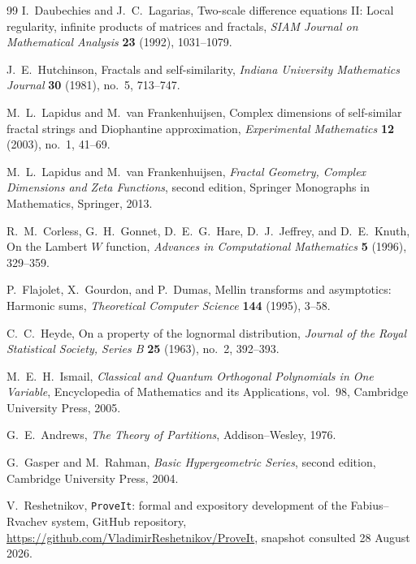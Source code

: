 \documentclass[11pt,oneside]{article}
\theoremstyle{definition}
\theoremstyle{remark}
\begin{document}
\begin{thebibliography}{99}
I.~Daubechies and J.~C.~Lagarias,
\newblock Two-scale difference equations II: Local regularity, infinite products of matrices and fractals,
\newblock \emph{SIAM Journal on Mathematical Analysis} \textbf{23} (1992), 1031--1079.

J.~E.~Hutchinson,
\newblock Fractals and self-similarity,
\newblock \emph{Indiana University Mathematics Journal} \textbf{30} (1981), no.~5, 713--747.

M.~L.~Lapidus and M.~van Frankenhuijsen,
\newblock Complex dimensions of self-similar fractal strings and Diophantine approximation,
\newblock \emph{Experimental Mathematics} \textbf{12} (2003), no.~1, 41--69.

M.~L.~Lapidus and M.~van Frankenhuijsen,
\newblock \emph{Fractal Geometry, Complex Dimensions and Zeta Functions}, second edition,
\newblock Springer Monographs in Mathematics, Springer, 2013.

R.~M.~Corless, G.~H.~Gonnet, D.~E.~G.~Hare, D.~J.~Jeffrey, and D.~E.~Knuth,
\newblock On the Lambert $W$ function,
\newblock \emph{Advances in Computational Mathematics} \textbf{5} (1996), 329--359.

P.~Flajolet, X.~Gourdon, and P.~Dumas,
\newblock Mellin transforms and asymptotics: Harmonic sums,
\newblock \emph{Theoretical Computer Science} \textbf{144} (1995), 3--58.

C.~C.~Heyde,
\newblock On a property of the lognormal distribution,
\newblock \emph{Journal of the Royal Statistical Society, Series B} \textbf{25} (1963), no.~2, 392--393.

M.~E.~H.~Ismail,
\newblock \emph{Classical and Quantum Orthogonal Polynomials in One Variable},
\newblock Encyclopedia of Mathematics and its Applications, vol.~98, Cambridge University Press, 2005.

G.~E.~Andrews,
\newblock \emph{The Theory of Partitions},
\newblock Addison--Wesley, 1976.

G.~Gasper and M.~Rahman,
\newblock \emph{Basic Hypergeometric Series}, second edition,
\newblock Cambridge University Press, 2004.

V.~Reshetnikov,
\newblock \texttt{ProveIt}: formal and expository development of the Fabius--Rvachev system,
\newblock GitHub repository, \url{https://github.com/VladimirReshetnikov/ProveIt}, snapshot consulted 28 August 2026.

\end{thebibliography}
\end{document}
